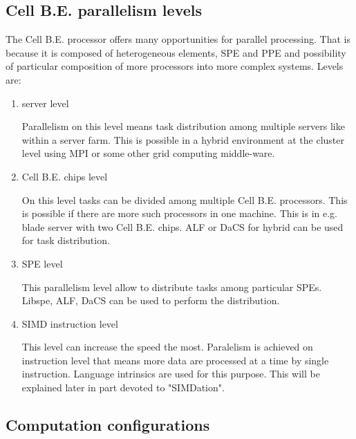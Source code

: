 \subsection {Cell B.E. parallelism levels}

The Cell B.E. processor offers many opportunities for parallel processing.
That is because it is composed of heterogeneous elements, SPE and PPE and possibility of particular composition of more processors into more complex systems.
 Levels are:
\begin{enumerate}
\item server level
\par
Parallelism on this level means task distribution among multiple servers like within a server farm.
This is possible in a hybrid environment at the cluster level using MPI or some other grid computing middle-ware.

\item Cell B.E. chips level
\par
On this level tasks can be divided among multiple Cell B.E. processors.
This is possible if there are more such processors in one machine.
This is in e.g. blade server with two Cell B.E. chips.
ALF or DaCS for hybrid can be used for task distribution.

\item SPE level
\par
This parallelism level allow to distribute tasks among particular SPEs.
Libspe, ALF, DaCS can be used to perform the distribution.

\item SIMD instruction level
\par
This level can increase the speed the most.
Paralelism is achieved on instruction level that means more data are processed at a time by single instruction.
Language intrinsics are used for this purpose.
This will be explained later in part devoted to "SIMDation".
\end{enumerate}

\subsection{Computation configurations}


